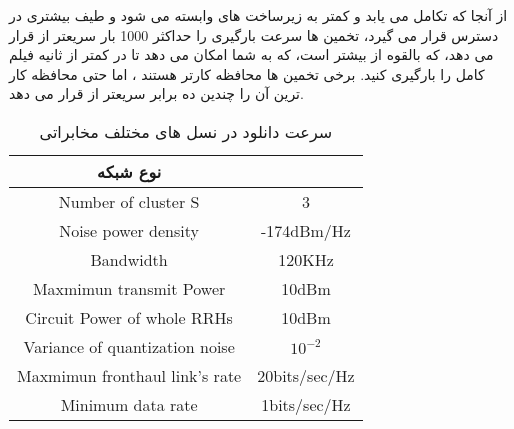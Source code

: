  از آنجا که
 تکامل می یابد و کمتر به زیرساخت های  وابسته می شود و طیف بیشتری در دسترس قرار می گیرد،
 تخمین ها سرعت بارگیری را حداکثر 1000 بار سریعتر از  قرار می دهد، که بالقوه از 
بیشتر است، که به شما امکان می دهد تا در کمتر از ثانیه فیلم کامل
   را بارگیری کنید.
   برخی تخمین ها محافظه کارتر هستند ، اما حتی محافظه کار ترین آن را چندین ده برابر سریعتر از  قرار می دهد.
   \begin{table}[H]
 \caption {سرعت دانلود در نسل های مختلف مخابراتی} \label{tab:title3} 
 \begin{center}
  \begin{tabular}{||c c ||} \hline
  نوع شبکه 
 \\ [0.5ex]  
  \hline\hline
  Number of cluster S & 3 \\ 
  \hline
  Noise power density & -174dBm/Hz\\
  \hline
  Bandwidth & 120KHz \\
  \hline
 Maxmimun transmit Power & 10dBm \\
  \hline
  Circuit Power of whole RRHs & 10dBm \\
  \hline
  Variance of quantization noise & $10^{-2}$ \\
  \hline
   Maxmimun fronthaul link's rate & 20bits/sec/Hz \\
  \hline
  Minimum data rate &  1bits/sec/Hz \\ [1ex] 
  \hline
 \end{tabular}
 \end{center}
 \end{table}
